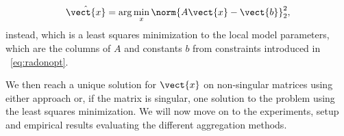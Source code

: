 \begin{equation}
    \hat{\vect{x}} = \arg\min_{x} \norm{A\vect{x} - \vect{b}}^2_2,
\end{equation}
instead, which is a least squares minimization \wrt to the local model parameters, which are the columns of $A$ and constants $b$ from constraints introduced in \eq~\ref{eq:radonopt}.

We then reach a unique solution for $\vect{x}$ on non-singular matrices using either approach or, if the matrix is singular, one solution to the problem using the least squares minimization.
We will now move on to the experiments, setup and empirical results evaluating the different aggregation methods.